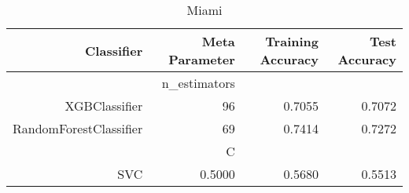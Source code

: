 
\begin{table}[H]
    \caption{Miami}
    \centering
    \begin{tabular}{|r|r|r|r|}
        \hline
        Classifier &Meta Parameter &Training Accuracy
        &Test Accuracy\\
        \hline
        &n\_estimators &\multicolumn{2}{|r|}{}\\
        \hline
        XGBClassifier &96 &0.7055 &0.7072\\
        \hline
        RandomForestClassifier &69 &0.7414 &0.7272\\
        \hline
        &C &\multicolumn{2}{|r|}{}\\
        \hline
        SVC &0.5000 &0.5680 &0.5513\\
        \hline
    \end{tabular}
\end{table}
